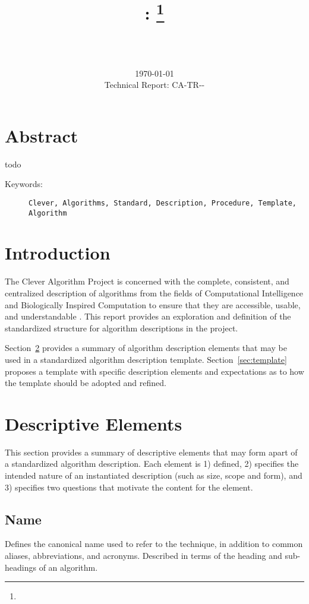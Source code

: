 \documentclass[a4paper, 11pt]{article}
\title{{\myreporttitle}: {\myreportsubtitle}\footnote{\myreportlicense}}
\author{\myreportauthor\\{\myreportemail}\\\small\myreportproject}
\date{\today\\{\small{Technical Report: CA-TR-{\myreportdate}-\myreportversion}}}
\begin{document}
\maketitle

\section*{Abstract} 
todo

\begin{description}
	\item[Keywords:] {\small\texttt{Clever, Algorithms, Standard, Description, Procedure, Template, Algorithm}}
\end{description} 

\section{Introduction}
\label{sec:introduction}
The Clever Algorithm Project is concerned with the complete, consistent, and centralized description of algorithms from the fields of Computational Intelligence and Biologically Inspired Computation to ensure that they are accessible, usable, and understandable \cite{Brownlee2010}.
This report provides an exploration and definition of the standardized structure for algorithm descriptions in the project.

Section~\ref{sec:elements} provides a summary of algorithm description elements that may be used in a standardized algorithm description template. Section~\ref{sec:template} proposes a template with specific description elements and expectations as to how the template should be adopted and refined.

\section{Descriptive Elements}
\label{sec:elements}
This section provides a summary of descriptive elements that may form apart of a standardized algorithm description. Each element is 1) defined, 2) specifies the intended nature of an instantiated description (such as size, scope and form), and 3) specifies two questions that motivate the content for the element.

\subsection{Name}
Defines the canonical name used to refer to the technique, in addition to common aliases, abbreviations, and acronyms. Described in terms of the heading and sub-headings of an algorithm.
\end{document}
